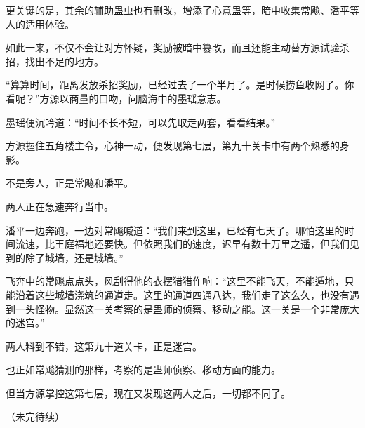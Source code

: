 \begin{this_body}
更关键的是，其余的辅助蛊虫也有删改，增添了心意蛊等，暗中收集常飚、潘平等人的适用体验。

如此一来，不仅不会让对方怀疑，奖励被暗中篡改，而且还能主动替方源试验杀招，找出不足的地方。

“算算时间，距离发放杀招奖励，已经过去了一个半月了。是时候捞鱼收网了。你看呢？”方源以商量的口吻，问脑海中的墨瑶意志。

墨瑶便沉吟道：“时间不长不短，可以先取走两套，看看结果。”

方源握住五角楼主令，心神一动，便发现第七层，第九十关卡中有两个熟悉的身影。

不是旁人，正是常飚和潘平。

两人正在急速奔行当中。

潘平一边奔跑，一边对常飚喊道：“我们来到这里，已经有七天了。哪怕这里的时间流速，比王庭福地还要快。但依照我们的速度，迟早有数十万里之遥，但我们见到的除了城墙，还是城墙。”

飞奔中的常飚点点头，风刮得他的衣摆猎猎作响：“这里不能飞天，不能遁地，只能沿着这些城墙浇筑的通道走。这里的通道四通八达，我们走了这么久，也没有遇到一头怪物。显然这一关考察的是蛊师的侦察、移动之能。这一关是一个非常庞大的迷宫。”

两人料到不错，这第九十道关卡，正是迷宫。

也正如常飚猜测的那样，考察的是蛊师侦察、移动方面的能力。

但当方源掌控这第七层，现在又发现这两人之后，一切都不同了。

（未完待续）

\end{this_body}

